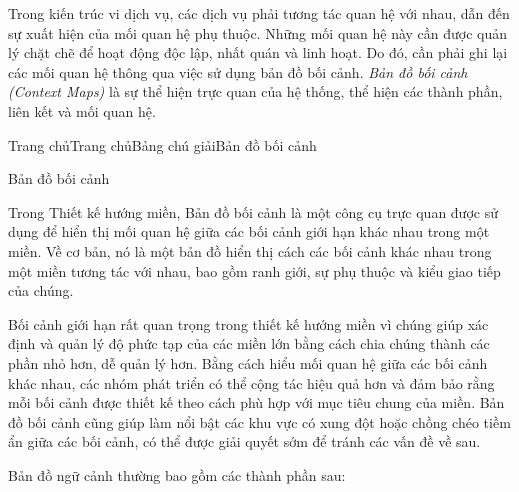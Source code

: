 Trong kiến trúc     vi dịch vụ, các dịch vụ phải tương tác quan hệ với nhau, dẫn đến sự xuất hiện của mối quan hệ phụ thuộc. Những mối quan hệ này cần được quản lý chặt chẽ để   hoạt động độc lập,   nhất quán và   linh hoạt.  Do đó, cần  phải   ghi lại các  mối quan hệ   thông qua việc sử dụng bản đồ bối cảnh.   \emph{Bản đồ bối cảnh (Context Maps)} là sự thể hiện trực quan của hệ thống, thể hiện các thành phần, liên kết và mối quan hệ.











Trang chủTrang chủBảng chú giảiBản đồ bối cảnh

Bản đồ bối cảnh

Trong Thiết kế hướng miền, Bản đồ bối cảnh là một công cụ trực quan được sử dụng để hiển thị mối quan hệ giữa các bối cảnh giới hạn khác nhau trong một miền. Về cơ bản, nó là một bản đồ hiển thị cách các bối cảnh khác nhau trong một miền tương tác với nhau, bao gồm ranh giới, sự phụ thuộc và kiểu giao tiếp của chúng.

Bối cảnh giới hạn rất quan trọng trong thiết kế hướng miền vì chúng giúp xác định và quản lý độ phức tạp của các miền lớn bằng cách chia chúng thành các phần nhỏ hơn, dễ quản lý hơn. Bằng cách hiểu mối quan hệ giữa các bối cảnh khác nhau, các nhóm phát triển có thể cộng tác hiệu quả hơn và đảm bảo rằng mỗi bối cảnh được thiết kế theo cách phù hợp với mục tiêu chung của miền. Bản đồ bối cảnh cũng giúp làm nổi bật các khu vực có xung đột hoặc chồng chéo tiềm ẩn giữa các bối cảnh, có thể được giải quyết sớm để tránh các vấn đề về sau.

Bản đồ ngữ cảnh thường bao gồm các thành phần sau:

